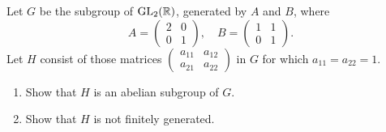 \documentclass{article}
\begin{document}
	\setlength{\parindent}{0pt}
	Let $G$ be the subgroup of $\textup{GL}_2(\mathbb{R})$, generated by $A$ and $B$, where
	$$A=\begin{pmatrix}
		2&0\\0&1
	\end{pmatrix},\quad B=\begin{pmatrix}
		1&1\\0&1
	\end{pmatrix}.$$
	Let $H$ consist of those matrices $\begin{pmatrix}
		a_{11}&a_{12}\\a_{21}&a_{22}
	\end{pmatrix}$ in $G$ for which $a_{11}=a_{22}=1$.
	\begin{enumerate}[label=(\alph*)]
		\item Show that $H$ is an abelian subgroup of $G$.
		\item Show that $H$ is not finitely generated.
	\end{enumerate}
\end{document}
